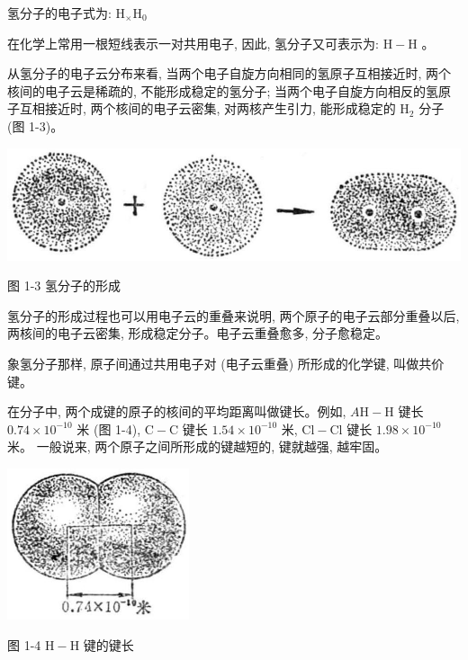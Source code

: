 \documentclass[10pt]{article}
\begin{document}
氢分子的电子式为: \({\mathrm{H}}_{ \times }{\mathrm{H}}_{0}\)

在化学上常用一根短线表示一对共用电子, 因此, 氢分子又可表示为: \(\mathrm{H} - \mathrm{H}\) 。

从氢分子的电子云分布来看, 当两个电子自旋方向相同的氢原子互相接近时, 两个核间的电子云是稀疏的, 不能形成稳定的氢分子; 当两个电子自旋方向相反的氢原子互相接近时, 两个核间的电子云密集, 对两核产生引力, 能形成稳定的 \({\mathrm{H}}_{2}\) 分子(图 1-3)。

\begin{center}
\includegraphics[max width=1.0\textwidth]{images/01912d13-9986-7822-a012-3f3f7be99dcb_12_238619.jpg}
\end{center}

图 1-3 氢分子的形成

氢分子的形成过程也可以用电子云的重叠来说明, 两个原子的电子云部分重叠以后, 两核间的电子云密集, 形成稳定分子。电子云重叠愈多, 分子愈稳定。

象氢分子那样, 原子间通过共用电子对 (电子云重叠) 所形成的化学键, 叫做共价键。

在分子中, 两个成键的原子的核间的平均距离叫做键长。例如, \(A\mathrm{H} - \mathrm{H}\) 键长 \({0.74} \times {10}^{-{10}}\) 米 (图 1-4), \(\mathrm{C} - \mathrm{C}\) 键长 \({1.54} \times {10}^{-{10}}\) 米, \(\mathrm{{Cl}} - \mathrm{{Cl}}\) 键长 \({1.98} \times {10}^{-{10}}\) 米。 一般说来, 两个原子之间所形成的键越短的, 键就越强, 越牢固。

\begin{center}
\includegraphics[max width=0.4\textwidth]{images/01912d13-9986-7822-a012-3f3f7be99dcb_12_265981.jpg}
\end{center}

图 1-4 \(\mathrm{H} - \mathrm{H}\) 键的键长
\end{document}
